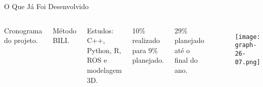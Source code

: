 \begin{frame}[t]{O Que Já Foi Desenvolvido}
    \newcommand\vertspacedesenv{0.35cm}

    \begin{columns}[t]
            Cronograma do projeto.
            \vspace*{\vertspacedesenv}
        
            Método BILI.
            \vspace*{\vertspacedesenv}
        
            Estudos: C++, Python, R, ROS e modelagem 3D.
            \vspace*{\vertspacedesenv}

            10\% realizado para 9\% planejado.
            \vspace*{\vertspacedesenv}

            29\% planejado até o final do ano.
            \vspace*{\vertspacedesenv}
            \begin{figure}[H]
                \vspace{-0.9cm}
                \texttt{[image: graph-26-07.png]}
            \end{figure}
    \end{columns}

    
\end{frame}






